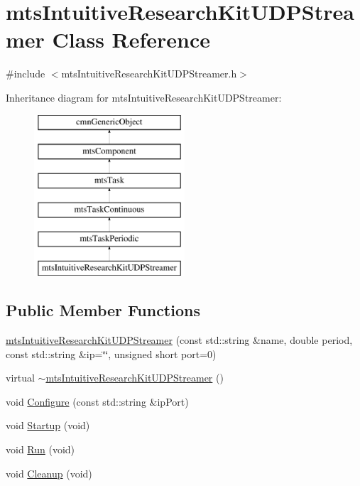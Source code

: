 \hypertarget{classmts_intuitive_research_kit_u_d_p_streamer}{\section{mts\-Intuitive\-Research\-Kit\-U\-D\-P\-Streamer Class Reference}
\label{classmts_intuitive_research_kit_u_d_p_streamer}
}


{\ttfamily \#include $<$mts\-Intuitive\-Research\-Kit\-U\-D\-P\-Streamer.\-h$>$}

Inheritance diagram for mts\-Intuitive\-Research\-Kit\-U\-D\-P\-Streamer\-:\begin{figure}[H]
\begin{center}
\leavevmode
\includegraphics[height=6.000000cm]{dd/d92/classmts_intuitive_research_kit_u_d_p_streamer}
\end{center}
\end{figure}
\subsection*{Public Member Functions}
\begin{DoxyCompactItemize}
\item 
\hyperlink{classmts_intuitive_research_kit_u_d_p_streamer_a4d68f5b7d022ee7be40fb554e07718a5}{mts\-Intuitive\-Research\-Kit\-U\-D\-P\-Streamer} (const std\-::string \&name, double period, const std\-::string \&ip=\char`\"{}\char`\"{}, unsigned short port=0)
\item 
virtual \hyperlink{classmts_intuitive_research_kit_u_d_p_streamer_ac430ca9b4664fd999b539f48e6c4850b}{$\sim$mts\-Intuitive\-Research\-Kit\-U\-D\-P\-Streamer} ()
\item 
void \hyperlink{classmts_intuitive_research_kit_u_d_p_streamer_a6cdd3746c9fe6cf5c5dc4671a0c61131}{Configure} (const std\-::string \&ip\-Port)
\item 
void \hyperlink{classmts_intuitive_research_kit_u_d_p_streamer_a07a4cfbae0395d18a12e1bb8ee2c17e0}{Startup} (void)
\item 
void \hyperlink{classmts_intuitive_research_kit_u_d_p_streamer_a300965bcb1e0bc75e323037f31213815}{Run} (void)
\item 
void \hyperlink{classmts_intuitive_research_kit_u_d_p_streamer_a03d77047da2f0331309d7719811e76b0}{Cleanup} (void)
\end{DoxyCompactItemize}
